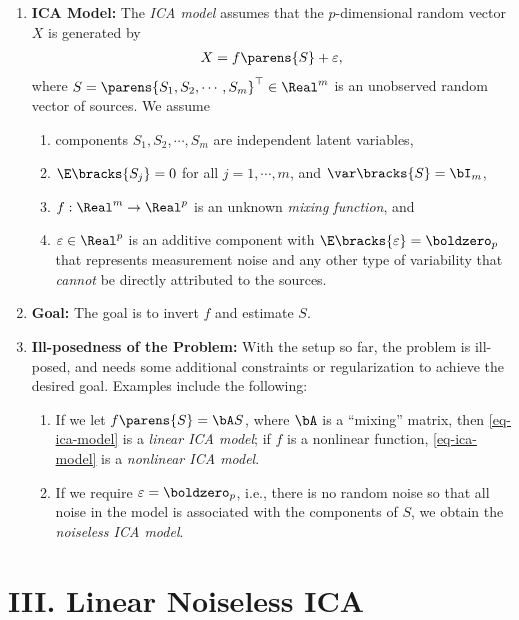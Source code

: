 \documentclass[12pt]{article}
\begin{document}
\begin{enumerate}[label=\textbf{\arabic*.}]
	
	\item \textbf{ICA Model:} The \textit{ICA model} assumes that the $p$-dimensional random vector $X$ is generated by 
	\begin{align}\label{eq-ica-model}
		X = f \parens{S} + \varepsilon, 
	\end{align}
	where $S = \parens{S_1, S_2, \cdots, S_m}^\top \in \Real^m$ is an unobserved random vector of sources. We assume 
	\begin{enumerate}
		\item components $S_1, S_2, \cdots, S_m$ are independent latent variables, 
		\item $\E \bracks{S_j} = 0$ for all $j = 1, \cdots, m$, and $\var \bracks{S} = \bI_m$, 
		\item $f: \Real^m \to \Real^p$ is an unknown \emph{mixing function}, and 
		\item $\varepsilon \in \Real^p$ is an additive component with $\E \bracks{\varepsilon} = \boldzero_{p}$ that represents measurement noise and any other type of variability that \emph{cannot} be directly attributed to the sources. 
	\end{enumerate}
	
	\item \textbf{Goal:} The goal is to invert $f$ and estimate $S$. 
	
	\item \textbf{Ill-posedness of the Problem:} With the setup so far, the problem is ill-posed, and needs some additional constraints or regularization to achieve the desired goal. Examples include the following: 
	\begin{enumerate}
		\item If we let $f \parens{S} = \bA S$, where $\bA$ is a ``mixing'' matrix, then \eqref{eq-ica-model} is a \emph{linear ICA model}; if $f$ is a nonlinear function, \eqref{eq-ica-model} is a \emph{nonlinear ICA model}. 
		\item If we require $\varepsilon = \boldzero_p$, i.e., there is no random noise so that all noise in the model is associated with the components of $S$, we obtain the \textit{noiseless ICA model}. 
	\end{enumerate}	
	
\end{enumerate}


\section*{III. Linear Noiseless ICA}
\end{document}
